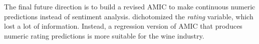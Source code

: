 \documentclass[aoas]{imsart}
\numberwithin{equation}{section}
\theoremstyle{plain}
\theoremstyle{remark}
\begin{document}
The final future direction is to build a revised AMIC to make continuous numeric predictions instead of sentiment analysis. \cite{chenyu} dichotomized the \textit{rating} variable, which lost a lot of information. Instead, a regression version of AMIC that produces numeric rating predictions is more suitable for the wine industry.   
%




\end{document}
